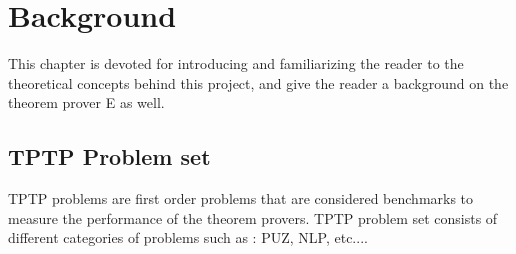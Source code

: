 \chapter{Background}\label{chap:background}

This chapter is devoted for introducing and familiarizing the reader to the theoretical concepts behind this project, and give the reader a background on the theorem prover E as well.



\section{TPTP Problem set}\label{sec:c2s2}
TPTP problems are first order problems that are considered benchmarks to measure the performance of the theorem provers. TPTP problem set consists of different categories of problems such as : PUZ, NLP, etc....



